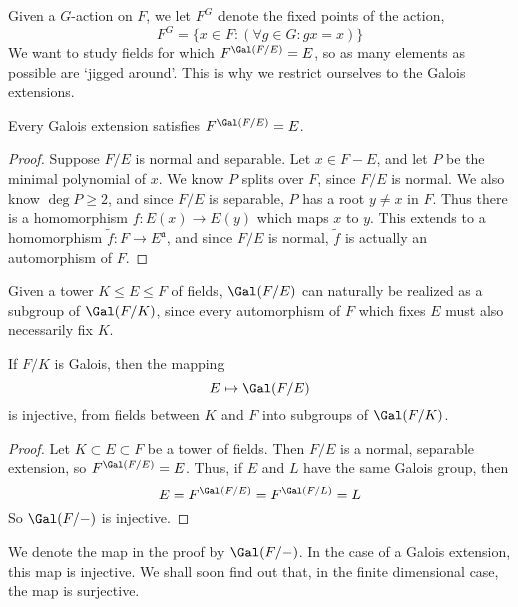 Given a $G$-action on $F$, we let $F^G$ denote the fixed points of the action,
%
\[ F^G = \{ x \in F: (\forall g \in G : gx = x) \} \]
%
We want to study fields for which $F^{\Gal(F/E)} = E$, so as many elements as possible are `jigged around'. This is why we restrict ourselves to the Galois extensions.

\begin{theorem}
    Every Galois extension satisfies $F^{\Gal(F/E)} = E$.
\end{theorem}
\begin{proof}
    Suppose $F/E$ is normal and separable. Let $x \in F - E$, and let $P$ be the minimal polynomial of $x$. We know $P$ splits over $F$, since $F/E$ is normal. We also know $\deg P \geq 2$, and since $F/E$ is separable, $P$ has a root $y \neq x$ in $F$. Thus there is a homomorphism $f: E(x) \to E(y)$ which maps $x$ to $y$. This extends to a homomorphism $\tilde{f}: F \to E^\mathfrak{a}$, and since $F/E$ is normal, $\tilde{f}$ is actually an automorphism of $F$.
\end{proof}

Given a tower $K \leq E \leq F$ of fields, $\Gal(F/E)$ can naturally be realized as a subgroup of $\Gal(F/K)$, since every automorphism of $F$ which fixes $E$ must also necessarily fix $K$.

\begin{lemma}
    If $F/K$ is Galois, then the mapping
    \[ E \mapsto \Gal(F/E) \]
    is injective, from fields between $K$ and $F$ into subgroups of $\Gal(F/K)$.
\end{lemma}
\begin{proof}
    Let $K \subset E \subset F$ be a tower of fields. Then $F/E$ is a normal, separable extension, so $F^{\Gal(F/E)} = E$. Thus, if $E$ and $L$ have the same Galois group, then
    \[ E = F^{\Gal(F/E)} = F^{\Gal(F/L)} = L \]
    So $\Gal(F/-)$ is injective.
\end{proof}

We denote the map in the proof by $\Gal(F/-)$. In the case of a Galois extension, this map is injective. We shall soon find out that, in the finite dimensional case, the map is surjective.

